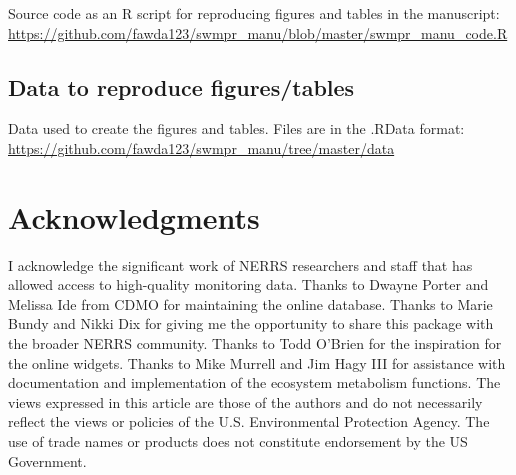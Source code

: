 \documentclass[10pt,letterpaper]{article}\usepackage[]{graphicx}\usepackage[]{color}
\begin{document}
Source code as an R script for reproducing figures and tables in the manuscript: \href{https://github.com/fawda123/swmpr_manu/blob/master/swmpr_manu_code.R}{https://github.com/fawda123/swmpr\_manu/blob/master/swmpr\_manu\_code.R}

\subsection*{Data to reproduce figures/tables}

Data used to create the figures and tables.  Files are in the .RData format: \href{https://github.com/fawda123/swmpr_manu/tree/master/data}{https://github.com/fawda123/swmpr\_manu/tree/master/data}

\section*{Acknowledgments}

I acknowledge the significant work of \ac{NERRS} researchers and staff that has allowed access to high-quality monitoring data.  Thanks to Dwayne Porter and Melissa Ide from \ac{CDMO} for maintaining the online database.  Thanks to Marie Bundy and Nikki Dix for giving me the opportunity to share this package with the broader \ac{NERRS} community.  Thanks to Todd O'Brien for the inspiration for the online widgets. Thanks to Mike Murrell and Jim Hagy III for assistance with documentation and implementation of the ecosystem metabolism functions. The views expressed in this article are those of the authors and do not necessarily reflect the views or policies of the U.S. Environmental Protection Agency.  The use of trade names or products does not constitute endorsement by the US Government.   

\nolinenumbers


\end{document}
